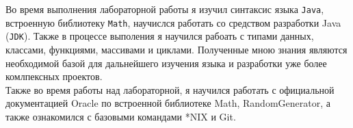 

    Во время выполнения лабораторной работы я изучил синтаксис языка \verb|Java|, встроенную библиотеку \verb|Math|, научислся работать со средством разработки Java (\verb|JDK|). Также в процессе выполения я научился рабоать с типами данных, классами, функциями, массивами и циклами. Полученные мною знания являются необходимой базой для дальнейшего изучения языка и разработки уже более комлпексных проектов.\\
    Также во время работы над лабораторной, я научился работать с официальной документацией Oracle по встроенной библиотеке Math\cite{oracledocmath}, RandomGenerator\cite{oracledocrandom}, а также ознакомился с базовыми командами *NIX\cite{gnudoc} и Git\cite{gitdoc}.
    \newpage





